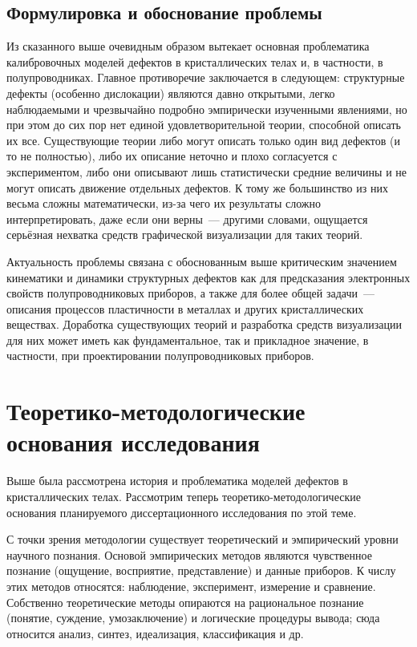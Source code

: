 \documentclass[a4paper, 14pt, titlepage]{extarticle}
\begin{document}
  \subsection{Формулировка и обоснование проблемы}

  Из сказанного выше очевидным образом вытекает основная проблематика калибровочных моделей дефектов
  в кристаллических телах и, в частности, в полупроводниках. Главное противоречие заключается в
  следующем: структурные дефекты (особенно дислокации) являются давно открытыми, легко наблюдаемыми
  и чрезвычайно подробно эмпирически изученными явлениями, но при этом до сих пор нет единой
  удовлетворительной теории, способной описать их все. Существующие теории либо могут описать только
  один вид дефектов (и то не полностью), либо их описание неточно и плохо согласуется с
  экспериментом, либо они описывают лишь статистически средние величины и не могут описать движение
  отдельных дефектов. К тому же большинство из них весьма сложны математически, из-за чего их
  результаты сложно интерпретировать, даже если они верны~--- другими словами, ощущается серьёзная
  нехватка средств графической визуализации для таких теорий.

  Актуальность проблемы связана с обоснованным выше критическим значением кинематики и динамики
  структурных дефектов как для предсказания электронных свойств полупроводниковых приборов, а также
  для более общей задачи~--- описания процессов пластичности в металлах и других кристаллических
  веществах. Доработка существующих теорий и разработка средств визуализации для них может иметь как
  фундаментальное, так и прикладное значение, в частности, при проектировании полупроводниковых
  приборов.

  \section{Теоретико-методологические основания исследования}

  Выше была рассмотрена история и проблематика моделей дефектов в кристаллических телах. Рассмотрим
  теперь теоретико-методологические основания планируемого диссертационного исследования по этой теме.

  С точки зрения методологии существует теоретический и эмпирический уровни научного познания.
  Основой эмпирических методов являются чувственное познание (ощущение, восприятие, представление) и
  данные приборов. К числу этих методов относятся: наблюдение, эксперимент, измерение и сравнение.
  Собственно теоретические методы опираются на рациональное познание (понятие, суждение,
  умозаключение) и логические процедуры вывода; сюда относится анализ, синтез, идеализация,
  классификация и др.
\end{document}
